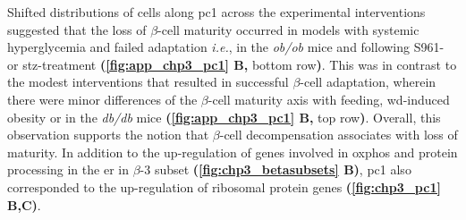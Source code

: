 \par Shifted distributions of cells along \gls{pc}1 across the experimental interventions suggested that the loss of $\beta$-cell maturity occurred in models with systemic hyperglycemia and failed adaptation \textit{i.e.}, in the \textit{ob/ob} mice and following S961- or \gls{stz}-treatment \textbf{(\autoref{fig:app_chp3_pc1} B,} bottom row\textbf{)}. This was in contrast to the modest interventions that resulted in successful $\beta$-cell adaptation, wherein there were minor differences of the $\beta$-cell maturity axis with feeding, \gls{wd}-induced obesity or in the \textit{db/db} mice \textbf{(\autoref{fig:app_chp3_pc1} B,} top row\textbf{)}. Overall, this observation supports the notion that $\beta$-cell decompensation associates with loss of maturity. In addition to the up-regulation of genes involved in \gls{oxphos} and protein processing in the \gls{er} in $\beta$-3 subset \textbf{(\autoref{fig:chp3_betasubsets} B)}, \gls{pc}1 also corresponded to the up-regulation of ribosomal protein genes \textbf{(\autoref{fig:chp3_pc1} B,C)}.\\ %


